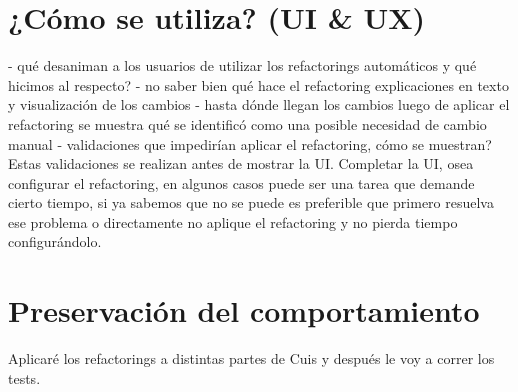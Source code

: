 \section{¿Cómo se utiliza? (UI \& UX)}
- qué desaniman a los usuarios de utilizar los refactorings automáticos y qué hicimos al respecto?
    - no saber bien qué hace el refactoring
    explicaciones en texto y visualización de los cambios
    - hasta dónde llegan los cambios
    luego de aplicar el refactoring se muestra qué se identificó como una posible necesidad de cambio manual
- validaciones que impedirían aplicar el refactoring, cómo se muestran? Estas validaciones se
realizan antes de mostrar la UI. Completar la UI, osea configurar el refactoring, en algunos
casos puede ser una tarea que demande cierto tiempo, si ya sabemos que no se puede es preferible
que primero resuelva ese problema o directamente no aplique el refactoring y no pierda tiempo
configurándolo.


\section{Preservación del comportamiento}
Aplicaré los refactorings a distintas partes de Cuis y después le voy a correr los tests.